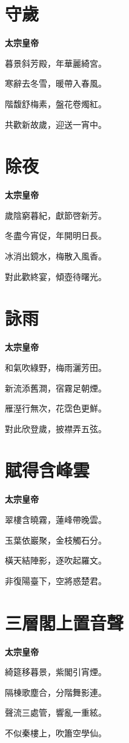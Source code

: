 \documentclass[12pt,a4paper]{ctexbook}
\begin{document}
\section{守歲}
\textbf{太宗皇帝}\par\vspace{0.5em}
暮景斜芳殿，年華麗綺宮。\par
寒辭去冬雪，暖帶入春風。\par
階馥舒梅素，盤花卷燭紅。\par
共歡新故歲，迎送一宵中。\par

\section{除夜}
\textbf{太宗皇帝}\par\vspace{0.5em}
歲陰窮暮紀，獻節啓新芳。\par
冬盡今宵促，年開明日長。\par
冰消出鏡水，梅散入風香。\par
對此歡終宴，傾壺待曙光。\par

\section{詠雨}
\textbf{太宗皇帝}\par\vspace{0.5em}
和氣吹綠野，梅雨灑芳田。\par
新流添舊澗，宿霧足朝煙。\par
雁溼行無次，花霑色更鮮。\par
對此欣登歲，披襟弄五弦。\par

\section{賦得含峰雲}
\textbf{太宗皇帝}\par\vspace{0.5em}
翠樓含曉霧，蓮峰帶晚雲。\par
玉葉依巖聚，金枝觸石分。\par
橫天結陣影，逐吹起羅文。\par
非復陽臺下，空將惑楚君。\par

\section{三層閣上置音聲}
\textbf{太宗皇帝}\par\vspace{0.5em}
綺筵移暮景，紫閣引宵煙。\par
隔棟歌塵合，分階舞影連。\par
聲流三處管，響亂一重絃。\par
不似秦樓上，吹簫空學仙。\par
\end{document}
